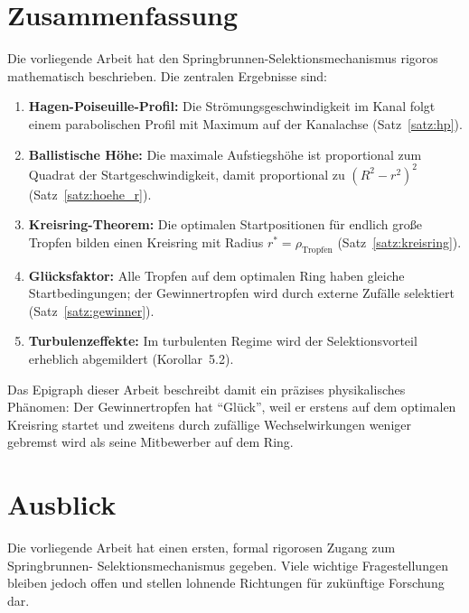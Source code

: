 ﻿\documentclass[a4paper,12pt]{article}
\theoremstyle{definition}
\begin{document}
\section{Zusammenfassung}

Die vorliegende Arbeit hat den Springbrunnen-Selektionsmechanismus rigoros mathematisch
beschrieben. Die zentralen Ergebnisse sind:

\begin{enumerate}
    \item \textbf{Hagen-Poiseuille-Profil:} Die Strömungsgeschwindigkeit im Kanal folgt
          einem parabolischen Profil mit Maximum auf der Kanalachse (Satz~\ref{satz:hp}).
    \item \textbf{Ballistische Höhe:} Die maximale Aufstiegshöhe ist proportional zum
          Quadrat der Startgeschwindigkeit, damit proportional zu $(R^2-r^2)^2$
          (Satz~\ref{satz:hoehe_r}).
    \item \textbf{Kreisring-Theorem:} Die optimalen Startpositionen für endlich große
          Tropfen bilden einen Kreisring mit Radius $r^* = \rho_{\text{Tropfen}}$
          (Satz~\ref{satz:kreisring}).
    \item \textbf{Glücksfaktor:} Alle Tropfen auf dem optimalen Ring haben gleiche
          Startbedingungen; der Gewinnertropfen wird durch externe Zufälle selektiert
          (Satz~\ref{satz:gewinner}).
    \item \textbf{Turbulenzeffekte:} Im turbulenten Regime wird der Selektionsvorteil
          erheblich abgemildert (Korollar~5.2).
\end{enumerate}

Das Epigraph dieser Arbeit beschreibt damit ein präzises physikalisches Phänomen:
Der Gewinnertropfen hat ``Glück'', weil er erstens auf dem optimalen Kreisring startet
und zweitens durch zufällige Wechselwirkungen weniger gebremst wird als seine
Mitbewerber auf dem Ring.

\section{Ausblick}

Die vorliegende Arbeit hat einen ersten, formal rigorosen Zugang zum Springbrunnen-
Selektionsmechanismus gegeben. Viele wichtige Fragestellungen bleiben jedoch offen
und stellen lohnende Richtungen für zukünftige Forschung dar.
\end{document}
